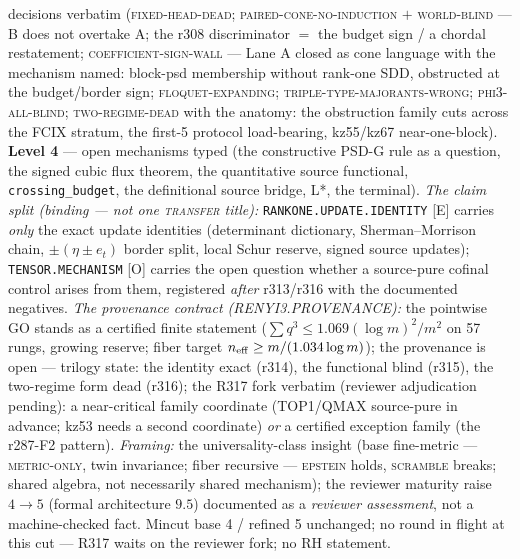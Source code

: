 \documentclass[11pt,a4paper]{article}
\begin{document}
{decisions verbatim (\textsc{fixed-head-dead};
\textsc{paired-cone-no-induction} $+$ \textsc{world-blind} --- B
does not overtake A; the r308 discriminator $=$ the budget sign /
a chordal restatement; \textsc{coefficient-sign-wall} --- Lane A
closed as cone language with the mechanism named: block-psd
membership without rank-one SDD, obstructed at the budget/border
sign; \textsc{floquet-expanding};
\textsc{triple-type-majorants-wrong}; \textsc{phi3-all-blind};
\textsc{two-regime-dead} with the anatomy: the obstruction family
cuts across the FCIX stratum, the first-5 protocol load-bearing,
kz55/kz67 near-one-block).  \textbf{Level 4} --- open mechanisms
typed (the constructive PSD-G rule as a question, the signed cubic
flux theorem, the quantitative source functional,
\texttt{crossing\_budget}, the definitional source bridge, L*, the
terminal).  \emph{The claim split (binding --- not one
\textsc{transfer} title):} \texttt{RANKONE.UPDATE.IDENTITY} [E]
carries \emph{only} the exact update identities (determinant
dictionary, Sherman--Morrison chain, $\pm(\eta\pm e_t)$ border
split, local Schur reserve, signed source updates);
\texttt{TENSOR.MECHANISM} [O] carries the open question whether a
source-pure cofinal control arises from them, registered
\emph{after} r313/r316 with the documented negatives.  \emph{The
provenance contract (RENYI3.PROVENANCE):} the pointwise GO stands
as a certified finite statement ($\sum q^3 \le
1.069(\log m)^2/m^2$ on 57 rungs, growing reserve; fiber target
$n_{\rm eff} \ge m/(1.034\log m)$); the provenance is open ---
trilogy state: the identity exact (r314), the functional blind
(r315), the two-regime form dead (r316); the R317 fork verbatim
(reviewer adjudication pending): a near-critical family coordinate
(TOP1/QMAX source-pure in advance; kz53 needs a second coordinate)
\emph{or} a certified exception family (the r287-F2 pattern).
\emph{Framing:} the universality-class insight (base fine-metric
--- \textsc{metric-only}, twin invariance; fiber recursive ---
\textsc{epstein} holds, \textsc{scramble} breaks; shared algebra,
not necessarily shared mechanism); the reviewer maturity raise
$4 \to 5$ (formal architecture $9.5$) documented as a
\emph{reviewer assessment}, not a machine-checked fact.  Mincut
base 4 / refined 5 unchanged; no round in flight at this cut ---
R317 waits on the reviewer fork; no RH statement.\par}
\end{document}
